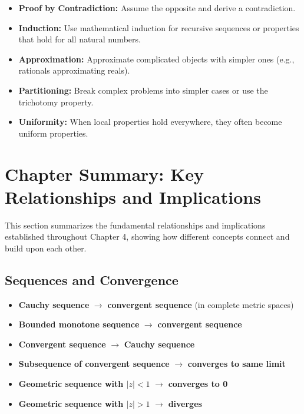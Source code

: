 \begin{itemize}
\item \textbf{Proof by Contradiction:} Assume the opposite and derive a contradiction.

\item \textbf{Induction:} Use mathematical induction for recursive sequences or properties that hold for all natural numbers.

\item \textbf{Approximation:} Approximate complicated objects with simpler ones (e.g., rationals approximating reals).

\item \textbf{Partitioning:} Break complex problems into simpler cases or use the trichotomy property.

\item \textbf{Uniformity:} When local properties hold everywhere, they often become uniform properties.
\end{itemize}

\section{Chapter Summary: Key Relationships and Implications}

This section summarizes the fundamental relationships and implications established throughout Chapter 4, showing how different concepts connect and build upon each other.

\subsection*{Sequences and Convergence}

\begin{itemize}
\item \textbf{Cauchy sequence} $\rightarrow$ \textbf{convergent sequence} (in complete metric spaces)
\item \textbf{Bounded monotone sequence} $\rightarrow$ \textbf{convergent sequence}
\item \textbf{Convergent sequence} $\rightarrow$ \textbf{Cauchy sequence}
\item \textbf{Subsequence of convergent sequence} $\rightarrow$ \textbf{converges to same limit}
\item \textbf{Geometric sequence with $|z| < 1$} $\rightarrow$ \textbf{converges to 0}
\item \textbf{Geometric sequence with $|z| > 1$} $\rightarrow$ \textbf{diverges}
\end{itemize}

